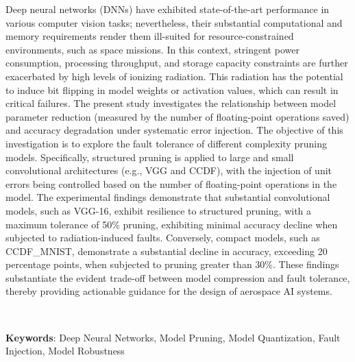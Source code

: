 
Deep neural networks (DNNs) have exhibited state-of-the-art performance in various computer vision tasks; nevertheless, their substantial computational and memory requirements render them ill-suited for resource-constrained environments, such as space missions. In this context, stringent power consumption, processing throughput, and storage capacity constraints are further exacerbated by high levels of ionizing radiation. This radiation has the potential to induce bit flipping in model weights or activation values, which can result in critical failures. The present study investigates the relationship between model parameter reduction (measured by the number of floating-point operations saved) and accuracy degradation under systematic error injection. The objective of this investigation is to explore the fault tolerance of different complexity pruning models. Specifically, structured pruning is applied to large and small convolutional architectures (e.g., VGG and CCDF), with the injection of unit errors being controlled based on the number of floating-point operations in the model. The experimental findings demonstrate that substantial convolutional models, such as VGG-16, exhibit resilience to structured pruning, with a maximum tolerance of 50\% pruning, exhibiting minimal accuracy decline when subjected to radiation-induced faults. Conversely, compact models, such as CCDF\_MNIST, demonstrate a substantial decline in accuracy, exceeding 20 percentage points, when subjected to pruning greater than 30\%. These findings substantiate the evident trade-off between model compression and fault tolerance, thereby providing actionable guidance for the design of aerospace AI systems.
\par\ \par
\textbf{Keywords}: Deep Neural Networks, Model Pruning, Model Quantization, Fault Injection, Model Robustness
